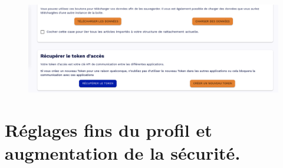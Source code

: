 \begin{figure}
	\centering
	\includegraphics{./Captures/portail.profil.bas.png}
	\caption{}
\end{figure}

\section{Réglages fins du profil et augmentation de la sécurité.}